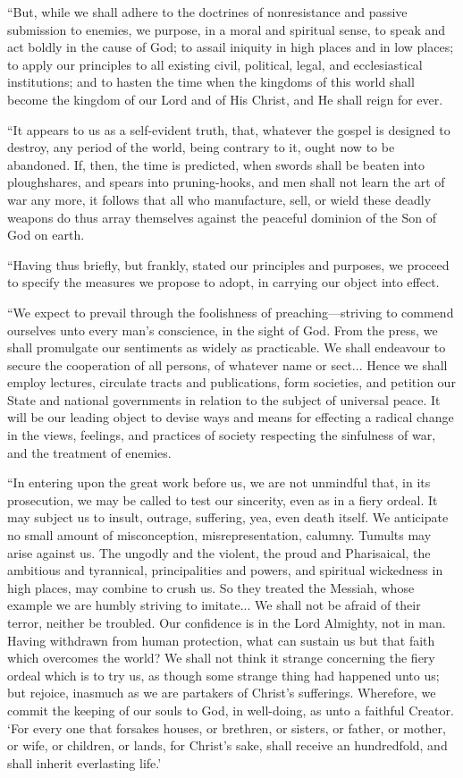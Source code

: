 \documentclass{book}
\begin{document}
“But, while we shall adhere to the doctrines of nonresistance and passive submission to enemies, we purpose, in a moral and spiritual sense, to speak and act boldly in the cause of God; to assail iniquity in high places and in low places; to apply our principles to all existing civil, political, legal, and ecclesiastical institutions; and to hasten the time when the kingdoms of this world shall become the kingdom of our Lord and of His Christ, and He shall reign for ever.

“It appears to us as a self-evident truth, that, whatever the gospel is designed to destroy, any period of the world, being contrary to it, ought now to be abandoned. If, then, the time is predicted, when swords shall be beaten into ploughshares, and spears into pruning-hooks, and men shall not learn the art of war any more, it follows that all who manufacture, sell, or wield these deadly weapons do thus array themselves against the peaceful dominion of the Son of God on earth.

“Having thus briefly, but frankly, stated our principles and purposes, we proceed to specify the measures we propose to adopt, in carrying our object into effect.

“We expect to prevail through the foolishness of preaching—striving to commend ourselves unto every man’s conscience, in the sight of God. From the press, we shall promulgate our sentiments as widely as practicable. We shall endeavour to secure the cooperation of all persons, of whatever name or sect... Hence we shall employ lectures, circulate tracts and publications, form societies, and petition our State and national governments in relation to the subject of universal peace. It will be our leading object to devise ways and means for effecting a radical change in the views, feelings, and practices of society respecting the sinfulness of war, and the treatment of enemies.

“In entering upon the great work before us, we are not unmindful that, in its prosecution, we may be called to test our sincerity, even as in a fiery ordeal. It may subject us to insult, outrage, suffering, yea, even death itself. We anticipate no small amount of misconception, misrepresentation, calumny. Tumults may arise against us. The ungodly and the violent, the proud and Pharisaical, the ambitious and tyrannical, principalities and powers, and spiritual wickedness in high places, may combine to crush us. So they treated the Messiah, whose example we are humbly striving to imitate... We shall not be afraid of their terror, neither be troubled. Our confidence is in the Lord Almighty, not in man. Having withdrawn from human protection, what can sustain us but that faith which overcomes the world? We shall not think it strange concerning the fiery ordeal which is to try us, as though some strange thing had happened unto us; but rejoice, inasmuch as we are partakers of Christ’s sufferings. Wherefore, we commit the keeping of our souls to God, in well-doing, as unto a faithful Creator. ‘For every one that forsakes houses, or brethren, or sisters, or father, or mother, or wife, or children, or lands, for Christ’s sake, shall receive an hundredfold, and shall inherit everlasting life.’
\end{document}
